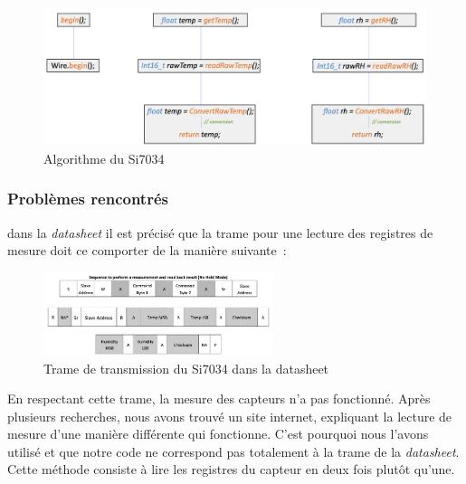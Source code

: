         \begin{figure}[!h]
            \begin{center}
                \includegraphics[width=.7\textwidth]{img/code/algo_si.png}
                \caption{\label{fig:algo_si}Algorithme du Si7034}  
            \end{center}
        \end{figure}


        \subsubsection{Problèmes rencontrés}    
        dans la \textit{datasheet} il est précisé que la trame pour une lecture des registres de mesure doit ce comporter de la manière suivante~: \\
        
        \begin{figure}[!h]
            \begin{center}
                \includegraphics[width=0.6\textwidth]{img/code/fake_trame_si.png}
                \caption{\label{fig:fake_trame_si}Trame de transmission du Si7034 dans la datasheet}  
            \end{center}
        \end{figure}

        \noindent
        En respectant cette trame, la mesure des capteurs n’a pas fonctionné. Après plusieurs recherches, nous avons trouvé un site internet, expliquant la lecture de mesure d'une manière différente qui fonctionne. C'est pourquoi nous l'avons utilisé et que notre 
        code ne correspond pas totalement à la trame de la \textit{datasheet}. Cette méthode consiste à lire les registres du capteur en deux fois plutôt qu'une. \\

